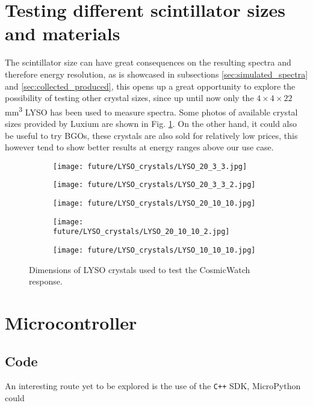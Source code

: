 \section{Testing different scintillator sizes and materials}

The scintillator size can have great consequences on the resulting spectra and therefore energy resolution, as is showcased in subsections \ref{sec:simulated_spectra} and \ref{sec:collected_produced}, this opens up a great opportunity to explore the possibility of testing other crystal sizes, since up until now only the $4\times4\times22$ \unit{\mm\cubed} LYSO has been used to measure spectra. Some photos of available crystal sizes provided by Luxium are shown in Fig. \ref{fig:LYSO_crystals}. On the other hand, it could also be useful to try BGOs, these crystals are also sold for relatively low prices, this however tend to show better results at energy ranges above our use case.

\begin{figure}[H]
    \begin{subfigure}[t]{0.49\textwidth}
        \centering
        \texttt{[image: future/LYSO\_crystals/LYSO\_20\_3\_3.jpg]}
    \end{subfigure}
    \begin{subfigure}[t]{0.49\textwidth}
        \centering
        \texttt{[image: future/LYSO\_crystals/LYSO\_20\_3\_3\_2.jpg]}
    \end{subfigure}
    \medskip
    \begin{subfigure}[t]{0.49\textwidth}
        \centering
        \texttt{[image: future/LYSO\_crystals/LYSO\_20\_10\_10.jpg]}
    \end{subfigure}
    \begin{subfigure}[t]{0.49\textwidth}
        \centering
        \texttt{[image: future/LYSO\_crystals/LYSO\_20\_10\_10\_2.jpg]}
    \end{subfigure}
    \medskip
    \begin{subfigure}[t]{\textwidth}
        \centering
        \texttt{[image: future/LYSO\_crystals/LYSO\_10\_10\_10.jpg]}
    \end{subfigure}
    \caption{\label{fig:LYSO_crystals}Dimensions of LYSO crystals used to test the CosmicWatch response.}
\end{figure}

\section{Microcontroller}

\subsection{Code}

An interesting route yet to be explored is the use of the \texttt{C++} SDK, MicroPython could 

\the\textwidth